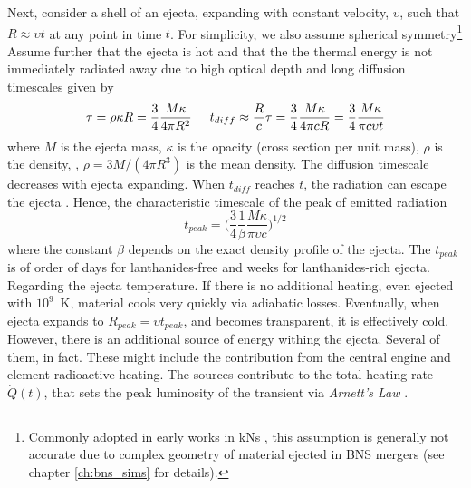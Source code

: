 %
Next, consider a shell of an ejecta, expanding with constant velocity, $\upsilon$, such that 
$R\approx\upsilon t$ at any point in time $t$. 
For simplicity, we also assume spherical symmetry\footnote{
    Commonly adopted in early works in \acp{kN} \citep[\eg][]{Roberts:2011,Grossman:2013lqa,Rosswog:2013kqa},
    this assumption is generally not accurate due to  complex geometry of material ejected in \ac{BNS} mergers 
    (see chapter \ref{ch:bns_sims} for details).
}
%
Assume further that the ejecta is hot and that the the thermal energy is not immediately 
radiated away due to high optical depth and long diffusion timescales given by 
%
\begin{equation}
    \tau = \rho \kappa R = \frac{3}{4}\frac{M\kappa}{4\pi R^2} \hspace{5mm} 
    t_{diff} \approx \frac{R}{c}\tau = \frac{3}{4}\frac{M\kappa}{4\pi c R} = \frac{3}{4}\frac{M\kappa}{\pi c \upsilon t}
\end{equation}
%
%
where $M$ is the ejecta mass, $\kappa$ is the opacity (cross section per unit mass), 
$\rho$ is the density, \eg, $\rho=3M/(4\pi R^3)$ is the mean density.
%
The diffusion timescale decreases with ejecta expanding. 
When $t_{diff}$ reaches $t$, the radiation can escape the ejecta \citep{Arnett:1982}. 
Hence, the characteristic timescale of the peak of emitted radiation 
\begin{equation}
    t_{peak} = \Big(\frac{3}{4}\frac{1}{\beta}\frac{M\kappa}{\pi \upsilon c}\Big)^{1/2}
\end{equation}
%
where the constant $\beta$ depends on the exact density profile of the ejecta. 
The $t_{peak}$ is of order of days for lanthanides-free and weeks for lanthanides-rich ejecta.
%
Regarding the ejecta temperature. If there is no additional heating, even ejected with $10^9$~K, 
material cools very quickly via adiabatic losses. Eventually, when ejecta expands to 
$R_{peak} = \upsilon t_{peak}$, and becomes transparent, it is effectively cold.
%
However, there is an additional source of energy withing the ejecta. Several of them, in fact. 
These might include the contribution from the central engine and \rproc{} element radioactive heating. 
The sources contribute to the total heating rate $\dot{Q}(t)$, that sets the peak luminosity 
of the transient via \textit{Arnett's Law} \citep{Arnett:1982}.



